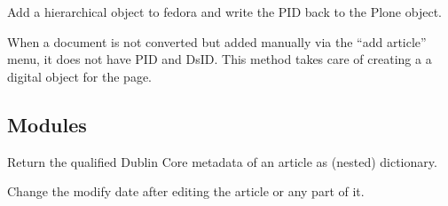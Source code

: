 \documentclass[a4paper,10pt,ngerman]{sphinxmanual}
\begin{document}
\label{tools:module-Products.DiPP.event_utils}

\begin{fulllineitems}
\label{tools:Products.DiPP.event_utils.createFedoraContainer}
Add a hierarchical object to fedora and write the PID back to the Plone
object.

\end{fulllineitems}


\begin{fulllineitems}
\label{tools:Products.DiPP.event_utils.createFedoraDatastream}
When a document is not converted but added manually via the ``add article''
menu, it does not have PID and DsID. This method takes care of creating a
a digital object for the page.

\end{fulllineitems}



\subsection{Modules}
\label{modules:modules}\label{modules:module-dipp.dipp3.qdc}\label{modules::doc}

\begin{fulllineitems}
\label{modules:dipp.dipp3.qdc.getQualifiedDCMetadata}
Return the qualified Dublin Core metadata of an article as (nested) dictionary.

\end{fulllineitems}


\begin{fulllineitems}
\label{modules:dipp.dipp3.qdc.setModified}
Change the modify date after editing the article or any part of it.

\end{fulllineitems}
\end{document}
